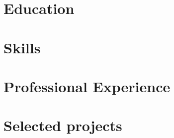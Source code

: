 \documentclass[letter,10pt]{article}
\begin{document}
\section{Education}


%

\section{Skills}


\section{Professional Experience}




\section{Selected projects}

\end{document}

